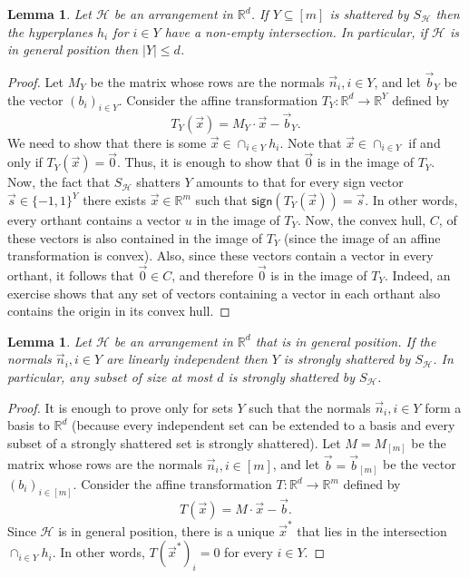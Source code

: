 \documentclass[11pt]{article}
\newtheorem{lemma}[theorem]{Lemma}
\theoremstyle{definition}
\newcommand{\1}{\mathbf{1}}
\newcommand{\R}{{\mathbb R}}
\renewcommand{\leq}{\leqslant}
\newcommand{\sign}{\mathsf{sign}}
\begin{document}
\begin{appendix}
\begin{lemma}
Let $\mathcal{H}$ be an arrangement in $\R^d$.
If $Y\subseteq [m]$ is shattered by $S_\mathcal{H}$
then the hyperplanes $h_i$ for $i\in Y$ have a non-empty intersection.
In particular, if $\mathcal{H}$ is in general position then $|Y|\leq d$.
\end{lemma}
\begin{proof}
Let $M_Y$ be the matrix whose rows are the normals $\vec n_i,i\in Y$,
and let $\vec b_Y$ be the vector $(b_i)_{i\in Y}$.
Consider the affine transformation $T_Y:\R^d\rightarrow\R^{Y}$ defined by
$$T_Y(\vec x) = M_Y\cdot \vec x - \vec b_Y.$$
We need to show that there is some $\vec x\in \cap_{i\in Y}h_i$.
Note that $\vec x\in \cap_{i\in Y}$ if and only if $T_Y(\vec x) = \vec 0$.
Thus, it is enough to show that $\vec 0$ is in the image of $T_Y$.
Now, the fact that $S_\mathcal{H}$ shatters $Y$ amounts to that
for every sign vector $\vec s\in\{-1,1\}^Y$ there exists $\vec x\in\R^m$
such that $\sign(T_Y(\vec x)) = \vec s$. In other words, every orthant contains a vector $u$ in the image of $T_Y$. Now, the convex hull, $C$, of these vectors is also contained in the image
of $T_Y$ (since the image of an affine transformation is convex). Also, since these vectors contain a vector in every orthant, it follows  that $\vec 0\in C$, and therefore $\vec 0$ is in the image of $T_Y$.  Indeed, an exercise shows that any set of vectors containing a vector in each orthant also contains the origin in its convex hull.
\end{proof}
\begin{lemma}
Let $\mathcal{H}$ be an arrangement in $\R^d$ that is in general position.
If the normals $\vec n_i, i\in Y$ are linearly independent
then $Y$ is strongly shattered by $S_\mathcal{H}$.
In particular, any subset of size at most $d$ is strongly shattered by $S_\mathcal{H}$.
\end{lemma} 
\begin{proof}
It is enough to prove only for sets $Y$ such that the normals $\vec n_i, i\in Y$ form a basis to $\R^d$ (because every independent set can be extended to a basis and every subset of a strongly shattered set is strongly shattered).
Let $M=M_{[m]}$ be the matrix whose rows are the normals $\vec n_i,i\in [m]$,
and let $\vec b = \vec b_{[m]}$ be the vector $(b_i)_{i\in [m]}$.
Consider the affine transformation $T:\R^d\rightarrow\R^{m}$ defined by
$$T(\vec x) = M\cdot \vec x - \vec b.$$
Since $\mathcal{H}$ is in general position, there is a unique $\vec x^*$ that lies in the intersection $\cap_{i\in Y}h_i$. In other words, $T(\vec x^*)_i = 0$ for every $i\in Y$.

\end{proof}
\end{appendix}
\end{document}
